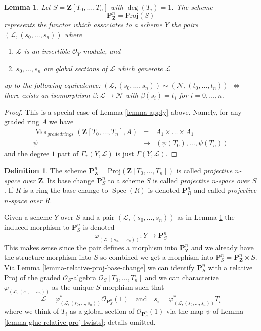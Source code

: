 \documentclass{stacks-project}
\theoremstyle{plain}
\newtheorem{lemma}[subsection]{Lemma}
\theoremstyle{definition}
\newtheorem{definition}[subsection]{Definition}
\theoremstyle{remark}
\numberwithin{equation}{subsection}
\def\Spec{\mathop{\mathrm{Spec}}}
\def\Mor{\mathop{\mathrm{Mor}}\nolimits}
\begin{document}
\begin{lemma}
\label{lemma-projective-space}
Let $S = \mathbf{Z}[T_0, \ldots, T_n]$ with $\deg(T_i) = 1$.
The scheme
$$
\mathbf{P}^n_{\mathbf{Z}} = \text{Proj}(S)
$$
represents the functor which associates to a scheme $Y$ the pairs
$(\mathcal{L}, (s_0, \ldots, s_n))$ where
\begin{enumerate}
\item $\mathcal{L}$ is an invertible $\mathcal{O}_Y$-module, and
\item $s_0, \ldots, s_n$ are global sections of $\mathcal{L}$
which generate $\mathcal{L}$
\end{enumerate}
up to the following equivalence:
$(\mathcal{L}, (s_0, \ldots, s_n)) \sim
(\mathcal{N}, (t_0, \ldots, t_n))$ $\Leftrightarrow$ there exists
an isomorphism $\beta : \mathcal{L} \to \mathcal{N}$
with $\beta(s_i) = t_i$ for $i = 0, \ldots, n$.
\end{lemma}

\begin{proof}
This is a special case of Lemma \ref{lemma-apply} above.
Namely, for any graded ring $A$ we have
\begin{eqnarray*}
\Mor_{graded rings}(\mathbf{Z}[T_0, \ldots, T_n], A)
& = &
A_1 \times \ldots \times A_1 \\
\psi & \mapsto & (\psi(T_0), \ldots, \psi(T_n))
\end{eqnarray*}
and the degree $1$ part of $\Gamma_*(Y, \mathcal{L})$ is
just $\Gamma(Y, \mathcal{L})$.
\end{proof}

\begin{definition}
\label{definition-projective-space}
The scheme
$\mathbf{P}^n_{\mathbf{Z}} = \text{Proj}(\mathbf{Z}[T_0, \ldots, T_n])$
is called {\it projective $n$-space over $\mathbf{Z}$}.
Its base change $\mathbf{P}^n_S$ to a scheme $S$ is called
{\it projective $n$-space over $S$}. If $R$ is a ring the base change
to $\Spec(R)$ is denoted $\mathbf{P}^n_R$ and called
{\it projective $n$-space over $R$}.
\end{definition}

\noindent
Given a scheme $Y$ over $S$
and a pair $(\mathcal{L}, (s_0, \ldots, s_n))$ as in
Lemma \ref{lemma-projective-space}
the induced morphism to $\mathbf{P}^n_S$ is denoted
$$
\varphi_{(\mathcal{L}, (s_0, \ldots, s_n))} :
Y \longrightarrow \mathbf{P}^n_S
$$
This makes sense since the pair defines a morphism into
$\mathbf{P}^n_{\mathbf{Z}}$ and we already have the structure
morphism into $S$ so combined we get a morphism into
$\mathbf{P}^n_S = \mathbf{P}^n_{\mathbf{Z}} \times S$.
Via Lemma \ref{lemma-relative-proj-base-change}
we can identify $\mathbf{P}^n_S$ with a relative Proj of
the graded $\mathcal{O}_S$-algebra $\mathcal{O}_S[T_0, \ldots, T_n]$
and we can characterize $\varphi_{(\mathcal{L}, (s_0, \ldots, s_n))}$
as the unique $S$-morphism such that
$$
\mathcal{L} =
\varphi_{(\mathcal{L}, (s_0, \ldots, s_n))}^*\mathcal{O}_{\mathbf{P}^n_S}(1)
\quad
\text{and}
\quad
s_i = \varphi_{(\mathcal{L}, (s_0, \ldots, s_n))}^*T_i
$$
where we think of $T_i$ as a global section of
$\mathcal{O}_{\mathbf{P}^n_S}(1)$ via the map $\psi$ of
Lemma \ref{lemma-glue-relative-proj-twists}; details omitted.
\end{document}
